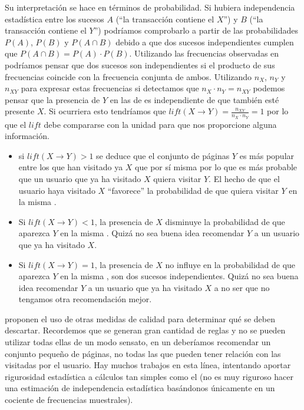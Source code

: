 Su interpretación se hace en términos de probabilidad. Si hubiera independencia estadística entre los sucesos $A$ ("`la transacción contiene el \itemset $X$"') y $B$ ("`la transacción contiene el \itemset $Y$"') podríamos comprobarlo a partir de las probabilidades $P(A)$, $P(B)$ y $P(A \cap B)$ debido a que dos sucesos independientes cumplen que $P(A \cap B) = P(A)\cdot P(B)$. Utilizando las frecuencias observadas en \D podríamos pensar que dos sucesos son independientes si el producto de sus frecuencias coincide con la frecuencia conjunta de ambos. Utilizando $n_X$, $n_Y$ y $n_{XY}$ para expresar estas frecuencias si detectamos que $n_X\cdot n_Y = n_{XY}$ podemos pensar que la presencia de $Y$ en las \transacciones de \D es independiente de que también esté presente $X$. Si ocurriera esto tendríamos que $lift(X \rightarrow Y) = \frac{n_{XY}}{n_X\cdot n_Y} = 1$ por lo que el $lift$ debe compararse con la unidad para que nos proporcione alguna información.

\begin{itemize}
  \item  si $lift(X \rightarrow Y) > 1$ se deduce que el conjunto de páginas $Y$ es más popular entre los que han visitado ya $X$ que por sí misma por lo que es más probable que un usuario que ya ha visitado $X$ quiera visitar $Y$. El hecho de que el usuario haya visitado $X$ "`favorece"' la probabilidad de que quiera visitar $Y$ en la misma \sn.
  \item Si $lift(X \rightarrow Y) < 1$, la presencia de $X$ disminuye la probabilidad de que aparezca $Y$ en la misma \sn. Quizá no sea buena idea recomendar $Y$ a un usuario que ya ha visitado $X$.
  \item Si $lift(X \rightarrow Y) = 1$, la presencia de $X$ no influye en la probabilidad de que aparezca $Y$ en la misma \sn, son dos sucesos independientes. Quizá no sea buena idea recomendar $Y$ a un usuario que ya ha visitado $X$ a no ser que no tengamos otra recomendación mejor.
\end{itemize}

\cite{AnCercone-RuleQualityMeasures-2001} proponen el uso de otras medidas de calidad para determinar qué \ARs se deben descartar. Recordemos que se generan gran cantidad de reglas y no se pueden utilizar todas ellas de un modo sensato, en un \srw deberíamos recomendar un conjunto pequeño de páginas, no todas las que pueden tener relación con las visitadas por el usuario. Hay muchos trabajos en esta línea, intentando aportar rigurosidad estadística a cálculos tan simples como el \lift (no es muy riguroso hacer una estimación de independencia estadística basándonos únicamente en un cociente de frecuencias muestrales).

